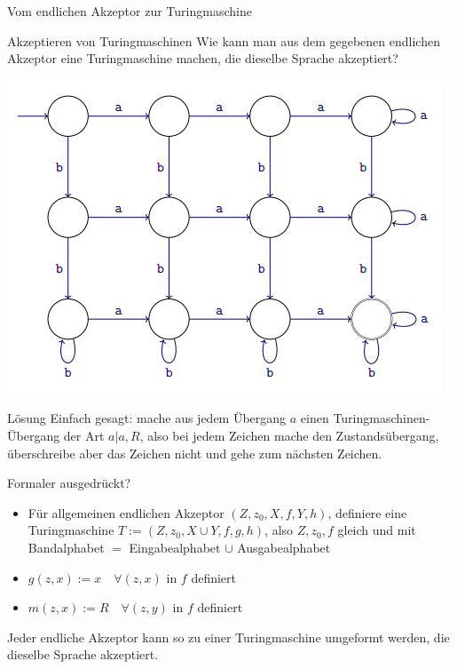 \begin{frame}{Vom endlichen Akzeptor zur Turingmaschine}
	\begin{taskblock}{Akzeptieren von Turingmaschinen}
		Wie kann man aus dem gegebenen endlichen Akzeptor eine Turingmaschine machen, die dieselbe Sprache akzeptiert?
	\end{taskblock}

	\includegraphics[scale=0.5]{images/AufgAkzeptor2.png}
\end{frame}

\begin{frame}{Lösung}
	Einfach gesagt: mache aus jedem Übergang $a$ einen Turingmaschinen-Übergang der Art $a|a,R$, also bei jedem Zeichen mache den Zustandsübergang, überschreibe aber das Zeichen nicht und gehe zum nächsten Zeichen.
	
	\vspace{.2cm}
	\bp
	
	Formaler ausgedrückt? \pause 
	\begin{itemize}
		\item Für allgemeinen endlichen Akzeptor $(Z, z_0, X, f, Y, h)$, definiere eine Turingmaschine $T := (Z, z_0, X \cup Y, f, g, h)$, also $Z, z_0, f$ gleich und mit Bandalphabet $=$ Eingabealphabet $\cup$ Ausgabealphabet
		\item $g(z, x) := x \quad \forall (z,x)$ in $f$ definiert
		\item $m(z, x) := R \quad \forall (z,y)$ in $f$ definiert		
	\end{itemize}

	\bp
	
	Jeder endliche Akzeptor kann so zu einer Turingmaschine umgeformt werden, die dieselbe Sprache akzeptiert.
\end{frame}

